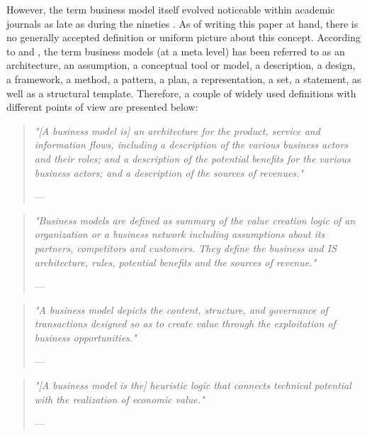However, the term business model itself evolved noticeable within academic journals as late as during the nineties . As of writing this paper at hand, there is no generally accepted definition or uniform picture about this concept. According to \citet[p. 726]{Morris2005} and \citet[p. 1022]{Zott2011}, the term business models (at a meta level) has been referred to as an architecture, an assumption, a conceptual tool or model, a description, a design, a framework, a method, a pattern, a plan, a representation, a set, a statement, as well as a structural template. Therefore, a couple of widely used definitions with different points of view are presented below:
	
\begin{quote}{\slshape 
"[A business model is] an architecture for the product, service and information flows, including a description of the various business actors and their roles; and a description of the potential benefits for the various business actors; and a description of the sources of revenues."}
\vspace*{-7pt}
\begin{flushright}
	--- \citet[p. 2]{Timmers1998}
\end{flushright}
\end{quote}

\begin{quote}{\slshape 
"Business models are defined as summary of the value creation logic of an organization or a business network including assumptions about its partners, competitors and customers. They define the business and IS architecture, rules, potential benefits and the sources of revenue."}
\vspace*{-7pt}
\begin{flushright}
	--- \citet[p. 798]{Klueber2000}
\end{flushright}
\end{quote}

\begin{quote}{\slshape 
"A business model depicts the content, structure, and governance of transactions designed so as to create value through the exploitation of business opportunities."}
\vspace*{-7pt}
\begin{flushright}
	--- \citet[p. 511]{Amit2001}
\end{flushright}
\end{quote}

\begin{quote}{\slshape 
"[A business model is the] heuristic logic that connects technical potential with the realization of economic value."}
\vspace*{-7pt}
\begin{flushright}
	--- \citet[p. 529]{Chesbrough2002}
\end{flushright}
\end{quote}

